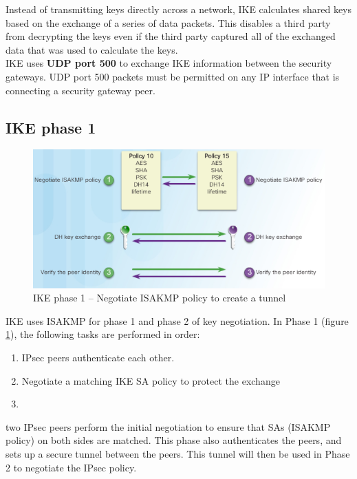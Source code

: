 Instead of transmitting keys directly across a network, IKE calculates shared keys based on the exchange of a series of data packets. This disables a third party from decrypting the keys even if the third party captured all of the exchanged data that was used to calculate the keys.\\

IKE uses \textbf{UDP port 500} to exchange IKE information between the security gateways. UDP port 500 packets must be permitted on any IP interface that is connecting a security gateway peer.

\subsection{IKE phase 1}

\begin{figure}[hbtp]
\caption{IKE phase 1 -- Negotiate ISAKMP policy to create a tunnel}\label{IKEphase1}
\centering
\includegraphics[scale=1]{pictures/IKEphase1.PNG}
\end{figure}

IKE uses ISAKMP for phase 1 and phase 2 of key negotiation. In Phase 1 (figure \ref{IKEphase1}), the following tasks are performed in order:

\begin{enumerate}
\item IPsec peers authenticate each other. 
\item Negotiate a matching IKE SA policy to protect the exchange
\item 
\end{enumerate}

two IPsec peers perform the initial negotiation to ensure that SAs (ISAKMP policy) on both sides are matched. This phase also authenticates the peers, and sets up a secure tunnel between the peers. This tunnel will then be used in Phase 2 to negotiate the IPsec policy.\\

